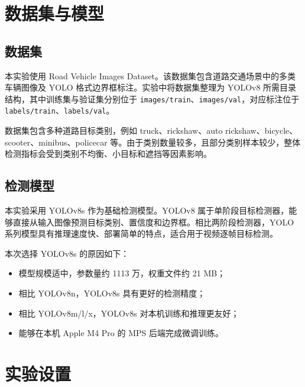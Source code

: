 \documentclass[UTF8,a4paper,12pt]{ctexart}
\begin{document}
\section{数据集与模型}

\subsection{数据集}

本实验使用 Road Vehicle Images Dataset。该数据集包含道路交通场景中的多类车辆图像及 YOLO 格式边界框标注。实验中将数据集整理为 YOLOv8 所需目录结构，其中训练集与验证集分别位于 \texttt{images/train}、\texttt{images/val}，对应标注位于 \texttt{labels/train}、\texttt{labels/val}。

数据集包含多种道路目标类别，例如 truck、rickshaw、auto rickshaw、bicycle、scooter、minibus、policecar 等。由于类别数量较多，且部分类别样本较少，整体检测指标会受到类别不均衡、小目标和遮挡等因素影响。

\subsection{检测模型}

本实验采用 YOLOv8s 作为基础检测模型。YOLOv8 属于单阶段目标检测器，能够直接从输入图像预测目标类别、置信度和边界框。相比两阶段检测器，YOLO 系列模型具有推理速度快、部署简单的特点，适合用于视频逐帧目标检测。

本次选择 YOLOv8s 的原因如下：

\begin{itemize}
    \item 模型规模适中，参数量约 1113 万，权重文件约 21 MB；
    \item 相比 YOLOv8n，YOLOv8s 具有更好的检测精度；
    \item 相比 YOLOv8m/l/x，YOLOv8s 对本机训练和推理更友好；
    \item 能够在本机 Apple M4 Pro 的 MPS 后端完成微调训练。
\end{itemize}

\section{实验设置}
\end{document}
